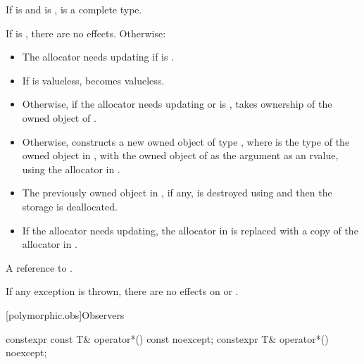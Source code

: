 \begin{itemdescr}
\pnum
\mandates
If
is  and
 is ,
 is a complete type.

\pnum
\effects
If  is , there are no effects.
Otherwise:

\begin{itemize}
\item
The allocator needs updating if
is .

\item
If  is valueless,  becomes valueless.

\item
Otherwise,
if the allocator needs updating or
 is ,
 takes ownership of the owned object of .

\item
Otherwise,
constructs a new owned object of type ,
where  is the type of the owned object in ,
with the owned object of
 as the argument as an rvalue,
using the allocator in .

\item
The previously owned object in , if any,
is destroyed using  and
then the storage is deallocated.

\item
If the allocator needs updating,
the allocator in  is replaced with
a copy of the allocator in .
\end{itemize}

\pnum
\returns
A reference to .

\pnum
\remarks
If any exception is thrown,
there are no effects on  or .
\end{itemdescr}

[polymorphic.obs]{Observers}

%
\begin{itemdecl}
constexpr const T& operator*() const noexcept;
constexpr T& operator*() noexcept;
\end{itemdecl}

